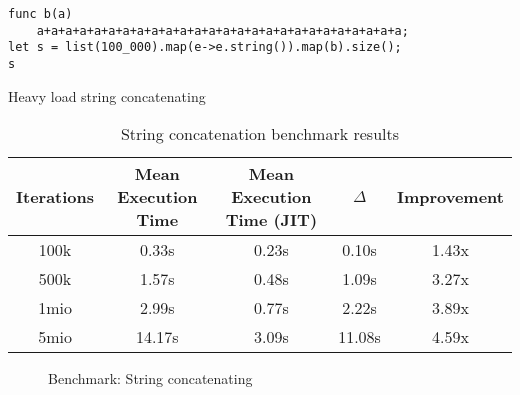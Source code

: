 \begin{listing}[H]
    \begin{verbatim}
func b(a)
    a+a+a+a+a+a+a+a+a+a+a+a+a+a+a+a+a+a+a+a+a+a+a+a+a+a;
let s = list(100_000).map(e->e.string()).map(b).size();
s
    \end{verbatim}
    \caption{Heavy load string concatenating}
    \label{code:benchmark-string}
\end{listing}

\begin{table}[H]
    \centering
    \begin{tabular}{c|c|c|c|c}
        Iterations & Mean Execution Time & Mean Execution Time (JIT) & $\Delta$ & Improvement \\ 
        \hline
        100k & 0.33s & 0.23s & 0.10s & 1.43x  \\
        500k & 1.57s & 0.48s & 1.09s & 3.27x  \\ 
        1mio & 2.99s & 0.77s & 2.22s & 3.89x  \\ 
        5mio & 14.17s & 3.09s & 11.08s & 4.59x\\ 
    \end{tabular}
    \label{table:benchmark-string}
    \caption{String concatenation benchmark results}
\end{table}

\begin{figure}[H]
    \centering
    \caption{Benchmark: String concatenating}
    \label{chart:benchmark-string}
\end{figure}

